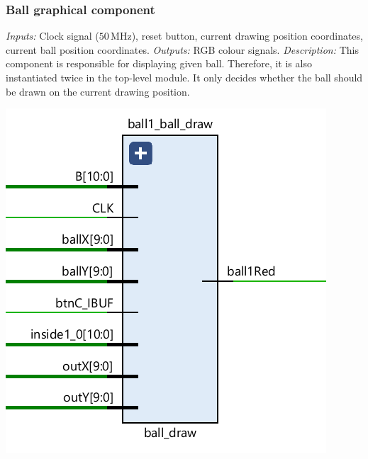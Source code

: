 \documentclass[11pt,a4paper]{article}
\def\MHz{\,\mathrm{MHz}}
\begin{document}
        \subsubsection*{Ball graphical component}
        \begin{minipage}{.45\textwidth}
            \emph{Inputs:} Clock signal ($50\MHz$), reset button, current drawing position coordinates, current ball position coordinates.
            \emph{Outputs:} RGB colour signals.
            \emph{Description:} This component is responsible for displaying given ball. Therefore, it is also instantiated twice in the top-level module. It only decides whether the ball should be drawn on the current drawing position.
        \end{minipage}
        \hfill
        \begin{minipage}{.45\textwidth}
            \includegraphics[width=\textwidth]{src/ball-draw.png}
        \end{minipage}
\end{document}
